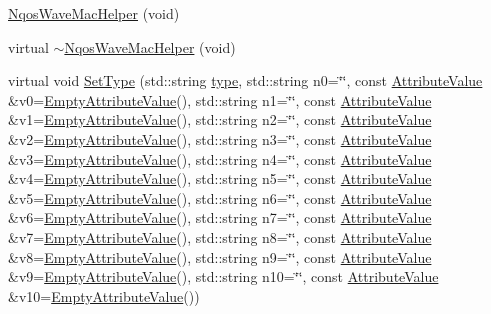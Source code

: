 \begin{DoxyCompactItemize}
\item 
\hyperlink{classns3_1_1NqosWaveMacHelper_adeb5327118d3e2ee25054365c5376bc9}{Nqos\+Wave\+Mac\+Helper} (void)
\item 
virtual \hyperlink{classns3_1_1NqosWaveMacHelper_ad4e77953871e03a570d5ad8e193522df}{$\sim$\+Nqos\+Wave\+Mac\+Helper} (void)
\item 
virtual void \hyperlink{classns3_1_1NqosWaveMacHelper_ac9a42891fa23e44c0ff58b818dd22a6f}{Set\+Type} (std\+::string \hyperlink{visualizer-ideas_8txt_add98db9e15e2a58cf2b57623e7aa893a}{type}, std\+::string n0=\char`\"{}\char`\"{}, const \hyperlink{classns3_1_1AttributeValue}{Attribute\+Value} \&v0=\hyperlink{classns3_1_1EmptyAttributeValue}{Empty\+Attribute\+Value}(), std\+::string n1=\char`\"{}\char`\"{}, const \hyperlink{classns3_1_1AttributeValue}{Attribute\+Value} \&v1=\hyperlink{classns3_1_1EmptyAttributeValue}{Empty\+Attribute\+Value}(), std\+::string n2=\char`\"{}\char`\"{}, const \hyperlink{classns3_1_1AttributeValue}{Attribute\+Value} \&v2=\hyperlink{classns3_1_1EmptyAttributeValue}{Empty\+Attribute\+Value}(), std\+::string n3=\char`\"{}\char`\"{}, const \hyperlink{classns3_1_1AttributeValue}{Attribute\+Value} \&v3=\hyperlink{classns3_1_1EmptyAttributeValue}{Empty\+Attribute\+Value}(), std\+::string n4=\char`\"{}\char`\"{}, const \hyperlink{classns3_1_1AttributeValue}{Attribute\+Value} \&v4=\hyperlink{classns3_1_1EmptyAttributeValue}{Empty\+Attribute\+Value}(), std\+::string n5=\char`\"{}\char`\"{}, const \hyperlink{classns3_1_1AttributeValue}{Attribute\+Value} \&v5=\hyperlink{classns3_1_1EmptyAttributeValue}{Empty\+Attribute\+Value}(), std\+::string n6=\char`\"{}\char`\"{}, const \hyperlink{classns3_1_1AttributeValue}{Attribute\+Value} \&v6=\hyperlink{classns3_1_1EmptyAttributeValue}{Empty\+Attribute\+Value}(), std\+::string n7=\char`\"{}\char`\"{}, const \hyperlink{classns3_1_1AttributeValue}{Attribute\+Value} \&v7=\hyperlink{classns3_1_1EmptyAttributeValue}{Empty\+Attribute\+Value}(), std\+::string n8=\char`\"{}\char`\"{}, const \hyperlink{classns3_1_1AttributeValue}{Attribute\+Value} \&v8=\hyperlink{classns3_1_1EmptyAttributeValue}{Empty\+Attribute\+Value}(), std\+::string n9=\char`\"{}\char`\"{}, const \hyperlink{classns3_1_1AttributeValue}{Attribute\+Value} \&v9=\hyperlink{classns3_1_1EmptyAttributeValue}{Empty\+Attribute\+Value}(), std\+::string n10=\char`\"{}\char`\"{}, const \hyperlink{classns3_1_1AttributeValue}{Attribute\+Value} \&v10=\hyperlink{classns3_1_1EmptyAttributeValue}{Empty\+Attribute\+Value}())
\end{DoxyCompactItemize}
